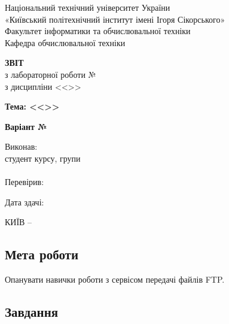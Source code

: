 \documentclass[14pt, a4paper]{extreport}
\begin{document}
	
	\begin{titlepage}
		\begin{center}
			\normalsize
			Національний технічний університет України\\
			«Київський політехнічний інститут імені Ігоря Сікорського» \\[0.5em]
			Факультет інформатики та обчислювальної техніки\\
			Кафедра обчислювальної техніки
			
			\vfill
			
			{\large \textbf{ЗВІТ}\\[0.5em]}
			{з лабораторної роботи №\LabNumber \\}
			{з дисципліни <<\CourseTitle>>}
			
			\vspace{2em}
			
			{\textbf{Тема: <<\Topic>>}}
			
			\vspace{1em}
			
			{\textbf{Варіант №\Variant}}
			
			\vfill
			
			\begin{flushright}
				Виконав: \\ студент \CourseNumber{} курсу, групи \StudentGroup \\
				\StudentName \\[1em]
				Перевірив: \\ \Teacher
			\end{flushright}
			
			\vfill
			
			\begin{flushright}
				Дата здачі: \DTMtoday
			\end{flushright}
			
			\vspace{5em}
			КИЇВ -- \ReportYear
		\end{center}
	\end{titlepage}
	
	\clearpage
	\setcounter{page}{2}
	
	\subsection*{Мета роботи} 
	Опанувати навички роботи з сервісом передачі файлів FTP.
	
	\subsection*{Завдання}
	
\end{document}
